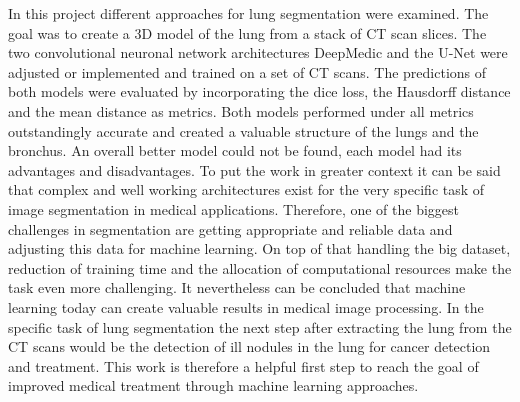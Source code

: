 
In this project different approaches for lung segmentation were examined. The goal was to create a 3D model of the lung from a stack of CT scan slices. The two convolutional neuronal network architectures DeepMedic and the U-Net were adjusted or implemented and trained on a set of CT scans. The predictions of both models were evaluated by incorporating the dice loss, the Hausdorff distance and the mean distance as metrics. Both models performed under all metrics outstandingly accurate and created a valuable structure of the lungs and the bronchus. An overall better model could not be found, each model had its advantages and disadvantages.\newline
To put the work in greater context it can be said that complex and well working architectures exist for the very specific task of image segmentation in medical applications. Therefore, one of the biggest challenges in segmentation are getting appropriate and reliable data and adjusting this data for machine learning. On top of that handling the big dataset, reduction of training time and the allocation of computational resources make the task even more challenging.\newline
It nevertheless can be concluded that machine learning today can create valuable results in medical image processing. In the specific task of lung segmentation the next step after extracting the lung from the CT scans would be the detection of ill nodules in the lung for cancer detection and treatment. This work is therefore a helpful first step to reach the goal of improved medical treatment through machine learning approaches.